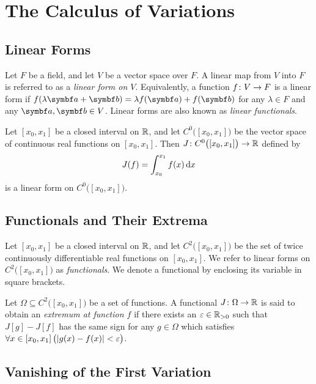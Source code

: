 



\section{The Calculus of Variations}

\subsection{Linear Forms}

Let \(F\) be a field, and let \(V\) be a vector space over \(F\). A linear map from \(V\) into \(F\) is referred to as a
\emph{linear form on \(V\)}. Equivalently, a function \(f\colon V\to F\) is a linear form if \(f(\lambda \vct{a}
+ \vct{b}) = \lambda f(\vct{a}) + f(\vct{b})\) for any \(\lambda \in F\) and any \(\vct{a}, \vct{b} \in V\). Linear
forms are also known as \emph{linear functionals}.

Let \([x_0, x_1]\) be a closed interval on \(\mathbb{R}\), and let \(C^0\big([x_0, x_1]\big)\) be the vector space of
continuous real functions on \([x_0, x_1]\). Then \(J\colon C^0\big([x_0, x_1]\big)\to\mathbb{R}\) defined by
\[
  J(f) = \int_{x_0}^{x_1} f(x) \mathop{}\!\mathrm{d} x
\]
is a linear form on \(C^0\big([x_0, x_1]\big)\).

\subsection{Functionals and Their Extrema}

Let \([x_0, x_1]\) be a closed interval on \(\mathbb{R}\), and let \(C^2\big([x_0, x_1]\big)\) be the set of twice
continuously differentiable real functions on \([x_0, x_1]\). We refer to linear forms on \(C^2\big([x_0, x_1]\big)\) as
\emph{functionals}. We denote a functional by enclosing its variable in square brackets.

Let \(\Omega \subseteq C^2\big([x_0, x_1]\big)\) be a set of functions. A functional \(J\colon\Omega\to\mathbb{R}\) is
said to obtain an \emph{extremum at function \(f\)} if there exists an \(\varepsilon \in \mathbb{R}_{>0}\) such that \(J[g]
- J[f]\) has the same sign for any \(g \in \Omega\) which satisfies \(\forall x \in [x_0, x_1] \, \big(\lvert g(x) - f(x)\rvert
< \varepsilon\big)\).

\subsection{Vanishing of the First Variation}

